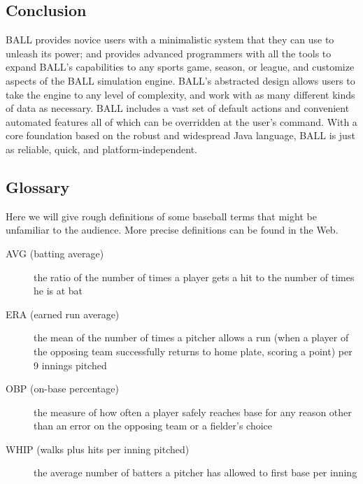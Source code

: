 \subsection{Conclusion}
BALL provides novice users with a minimalistic system that they can use to unleash its power; and provides advanced programmers with all the tools to expand BALL's capabilities to any sports game, season, or league, and customize aspects of the BALL simulation engine. BALL's abstracted design allows users to take the engine to any level of complexity, and work with as many different kinds of data as necessary. BALL includes a vast set of default actions and convenient automated features all of which can be overridden at the user's command. With a core foundation based on the robust and widespread Java language, BALL is just as reliable, quick, and platform-independent.
\subsection{Glossary}
Here we will give rough definitions of some baseball terms that might be unfamiliar to the audience. More precise definitions can be found in the Web.

\begin{description}
\item[AVG (batting average)]  the ratio of the number of times a player gets a hit to the number of times he is at bat
\item[ERA (earned run average)] the mean of the number of times a pitcher allows a run (when a player of the opposing team successfully returns to home plate, scoring a point) per 9 innings pitched
\item[OBP (on-base percentage)] the measure of how often a player safely reaches base for any reason other than an error on the opposing team or a fielder's choice
\item[WHIP (walks plus hits per inning pitched)] the average number of batters a pitcher has allowed to first base per inning
\end{description}
